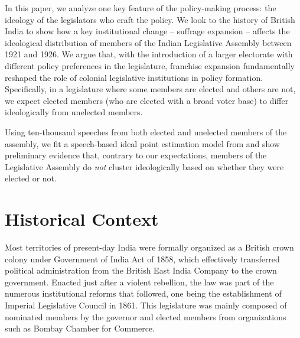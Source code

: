 \documentclass[12pt,letter]{article}
\begin{document}
In this paper, we analyze one key feature of the policy-making process: the ideology of the legislators who craft the policy. We look to the history of British India to show how a key institutional change -- suffrage expansion -- affects the ideological distribution of members of the Indian Legislative Assembly between 1921 and 1926. We argue that, with the introduction of a larger electorate with different policy preferences in the legislature, franchise expansion fundamentally reshaped the role of colonial legislative institutions in policy formation. Specifically, in a legislature where some members are elected and others are not, we expect elected members (who are elected with a broad voter base) to differ ideologically from unelected members.\par

Using ten-thousand speeches from both elected and unelected members of the assembly, we fit a speech-based ideal point estimation model from \textcite{vafaTextBasedIdealPoints2020} and show preliminary evidence that, contrary to our expectations, members of the Legislative Assembly do \textit{not} cluster ideologically based on whether they were elected or not. \par

\section{Historical Context}
Most territories of present-day India were formally organized as a British crown colony under Government of India Act of 1858, which effectively transferred political administration from the British East India Company to the crown government. Enacted just after a violent rebellion, the law was part of the numerous institutional reforms that followed, one being the establishment of Imperial Legislative Council in 1861. This legislature was mainly composed of nominated members by the governor and elected members from organizations such as Bombay Chamber for Commerce.\par
\end{document}
